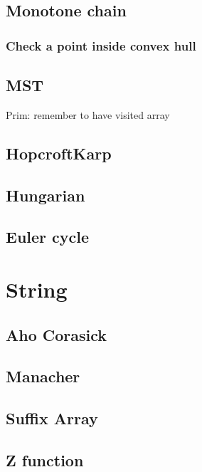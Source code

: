 \documentclass[a4paper, 12pt, oneside, landscape]{article}
\begin{document}
\begin{multicols}{2}
	\subsection{Monotone chain}
	
	
	\subsubsection{Check a point inside convex hull}
	

	\subsection{MST}
	Prim: remember to have visited array
	
	\subsection{HopcroftKarp}
	
	
	\subsection{Hungarian}
	
	
	\subsection{Euler cycle}
	
	
\section{String}
	\subsection{Aho Corasick}
	
	
	\subsection{Manacher}
	
	
	\subsection{Suffix Array}
	
	
	\subsection{Z function}
	
	

\end{multicols}
\end{document}
